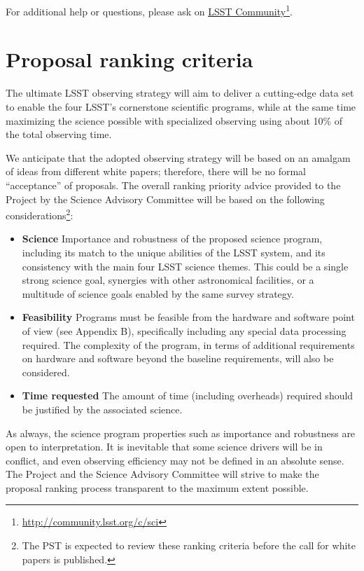 \documentclass[DM,lsstdraft,toc,usenatbib]{lsstdoc}
\begin{document}
For additional help or questions, please ask on \href{https://community.lsst.org/c/sci}{LSST Community}\footnote{\url{http://community.lsst.org/c/sci}}. 


\section{Proposal ranking criteria} 

The ultimate LSST observing strategy will aim to deliver a cutting-edge data set to enable
the four LSST's cornerstone scientific programs, while at the same time maximizing the 
science possible with specialized observing using about 10\% of the total observing time. 

We anticipate that the adopted observing strategy will be based on an amalgam of ideas from 
different white papers; therefore, there will be no formal ``acceptance'' of proposals. The
overall ranking priority advice provided to the Project by the Science Advisory Committee 
will be based on the following considerations\footnote{The PST is expected to review these ranking criteria before the call for white papers is published.}: 
\begin{itemize}
\item {\bf Science} Importance and robustness of the proposed science program, including 
           its match to the unique abilities of the LSST system, and its consistency with the 
           main four LSST science themes. This could be a single strong science goal, synergies with
           other astronomical facilities, or a multitude of science goals enabled by the same survey strategy. 
\item {\bf Feasibility} Programs must be feasible from the hardware and software point of view (see Appendix B),
         specifically including any special data processing required. The complexity of the program, in terms of additional
         requirements on hardware and software beyond the baseline requirements, will also be considered.
\item {\bf Time requested} The amount of time (including overheads) required should be justified by 
        the associated science. 
\end{itemize} 

As always, the science program properties such as importance and robustness are open
to interpretation. It is inevitable that some science drivers will be in conflict, and even
observing efficiency may not be defined in an absolute sense. The Project and the Science Advisory 
Committee will strive to make the proposal ranking process transparent to the maximum extent possible. 
\end{document}
